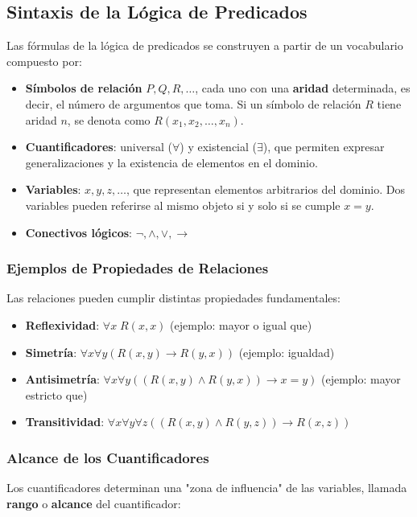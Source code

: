 \subsection{Sintaxis de la Lógica de Predicados}
Las fórmulas de la lógica de predicados se construyen a partir de un vocabulario compuesto por:

\begin{itemize}
   \item \textbf{Símbolos de relación} $P, Q, R, \dots$, cada uno con una \textbf{aridad} determinada, es decir, el número de argumentos que toma. Si un símbolo de relación $R$ tiene aridad $n$, se denota como $R(x_1, x_2, \dots, x_n)$.
    \item \textbf{Cuantificadores}: universal ($\forall$) y existencial ($\exists$), que permiten expresar generalizaciones y la existencia de elementos en el dominio.
    \item \textbf{Variables}: $x, y, z, \dots$, que representan elementos arbitrarios del dominio. Dos variables pueden referirse al mismo objeto si y solo si se cumple $x = y$.
    \item \textbf{Conectivos lógicos}: $\lnot, \land, \lor, \rightarrow$
\end{itemize}


\subsubsection{Ejemplos de Propiedades de Relaciones}
Las relaciones pueden cumplir distintas propiedades fundamentales:

\begin{itemize}
    \item \textbf{Reflexividad}: $\forall x \; R(x, x)$ (ejemplo: mayor o igual que)
    \item \textbf{Simetría}: $\forall x \forall y (R(x, y) \rightarrow R(y, x))$ (ejemplo: igualdad)
    \item \textbf{Antisimetría}: $\forall x \forall y ((R(x, y) \land R(y, x)) \rightarrow x = y)$ (ejemplo: mayor estricto que)
    \item \textbf{Transitividad}: $\forall x \forall y \forall z ((R(x, y) \land R(y, z)) \rightarrow R(x, z))$
\end{itemize}


\subsubsection{Alcance de los Cuantificadores}
Los cuantificadores determinan una "zona de influencia" de las variables, llamada \textbf{rango} o \textbf{alcance} del cuantificador:

